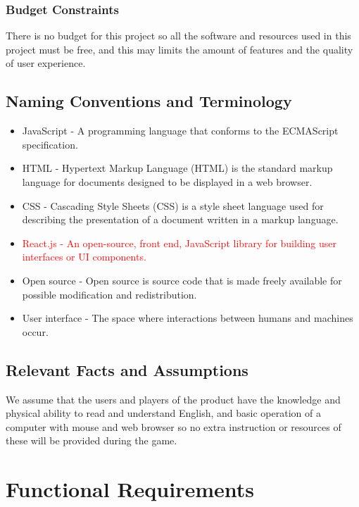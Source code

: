 \documentclass[12pt, titlepage]{article}
\begin{document}
\subsubsection{Budget Constraints}
There is no budget for this project so all the software and resources used in this project must be free, and this may limits the amount of features and the quality of user experience.
\subsection{Naming Conventions and Terminology}
\begin{itemize}
    \item JavaScript - A programming language that conforms to the ECMAScript specification.
    \item HTML - Hypertext Markup Language (HTML) is the standard markup language for documents designed to be displayed in a web browser. 
    \item CSS - Cascading Style Sheets (CSS) is a style sheet language used for describing the presentation of a document written in a markup language.
    \item \textcolor{red}{React.js - An open-source, front end, JavaScript library for building user interfaces or UI components. }
    \item Open source - Open source is source code that is made freely available for possible modification and redistribution.
    \item User interface - The space where interactions between humans and machines occur.
\end{itemize}

\subsection{Relevant Facts and Assumptions}
We assume that the users and players of the product have the knowledge and physical ability to read and understand English, and basic operation of a computer with mouse and web browser so no extra instruction or resources of these will be provided during the game.

\section{Functional Requirements}
\end{document}
